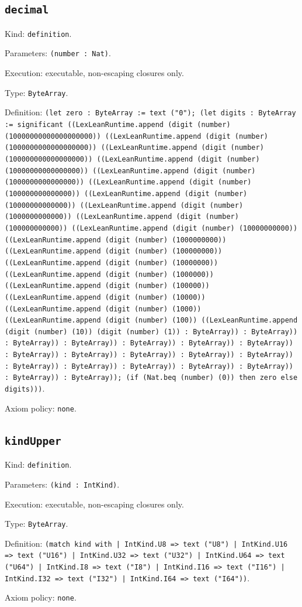 \documentclass[11pt]{article}
\begin{document}
\subsection*{\texttt{decimal}}
\noindent Kind: \texttt{definition}.\par
\noindent Parameters: \texttt{(number : Nat)}.\par
\noindent Execution: executable, non-escaping closures only.\par
\noindent Type: \texttt{ByteArray}.\par
\noindent Definition: \texttt{(let zero : ByteArray := text ("0"); (let digits : ByteArray := significant ((LexLeanRuntime.append (digit (number) (10000000000000000000)) ((LexLeanRuntime.append (digit (number) (1000000000000000000)) ((LexLeanRuntime.append (digit (number) (100000000000000000)) ((LexLeanRuntime.append (digit (number) (10000000000000000)) ((LexLeanRuntime.append (digit (number) (1000000000000000)) ((LexLeanRuntime.append (digit (number) (100000000000000)) ((LexLeanRuntime.append (digit (number) (10000000000000)) ((LexLeanRuntime.append (digit (number) (1000000000000)) ((LexLeanRuntime.append (digit (number) (100000000000)) ((LexLeanRuntime.append (digit (number) (10000000000)) ((LexLeanRuntime.append (digit (number) (1000000000)) ((LexLeanRuntime.append (digit (number) (100000000)) ((LexLeanRuntime.append (digit (number) (10000000)) ((LexLeanRuntime.append (digit (number) (1000000)) ((LexLeanRuntime.append (digit (number) (100000)) ((LexLeanRuntime.append (digit (number) (10000)) ((LexLeanRuntime.append (digit (number) (1000)) ((LexLeanRuntime.append (digit (number) (100)) ((LexLeanRuntime.append (digit (number) (10)) (digit (number) (1)) : ByteArray)) : ByteArray)) : ByteArray)) : ByteArray)) : ByteArray)) : ByteArray)) : ByteArray)) : ByteArray)) : ByteArray)) : ByteArray)) : ByteArray)) : ByteArray)) : ByteArray)) : ByteArray)) : ByteArray)) : ByteArray)) : ByteArray)) : ByteArray)) : ByteArray)); (if (Nat.beq (number) (0)) then zero else digits)))}.\par
\noindent Axiom policy: \texttt{none}.\par
\subsection*{\texttt{kindUpper}}
\noindent Kind: \texttt{definition}.\par
\noindent Parameters: \texttt{(kind : IntKind)}.\par
\noindent Execution: executable, non-escaping closures only.\par
\noindent Type: \texttt{ByteArray}.\par
\noindent Definition: \texttt{(match kind with | IntKind.U8 => text ("U8") | IntKind.U16 => text ("U16") | IntKind.U32 => text ("U32") | IntKind.U64 => text ("U64") | IntKind.I8 => text ("I8") | IntKind.I16 => text ("I16") | IntKind.I32 => text ("I32") | IntKind.I64 => text ("I64"))}.\par
\noindent Axiom policy: \texttt{none}.\par
\end{document}
